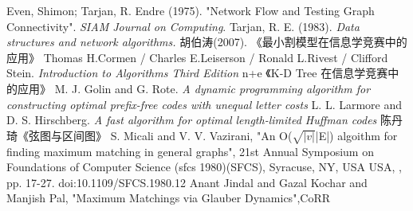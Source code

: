 \begin{thebibliography}{999}
	 Even, Shimon; Tarjan, R. Endre (1975).
	"Network Flow and Testing Graph Connectivity".
    \emph{SIAM Journal on Computing}.
     Tarjan, R. E. (1983).
    \emph{Data structures and network algorithms.}
    胡伯涛(2007). 《最小割模型在信息学竞赛中的应用》
      Thomas H.Cormen / Charles E.Leiserson /
     Ronald L.Rivest / Clifford Stein.
     \emph{Introduction to Algorithms Third Edition}
    n+e 《K-D Tree 在信息学竞赛中的应用》
    M. J. Golin and G. Rote.
    \emph{A dynamic programming algorithm for constructing optimal
    prefix-free codes with unequal letter costs}
    L. L. Larmore and D. S. Hirschberg.
    \emph{A fast algorithm for optimal length-limited Huffman codes}
     陈丹琦《弦图与区间图》
    S. Micali and V. V. Vazirani,
    "An O($\sqrt{|v|}$|E|) algoithm for finding maximum matching
    in general graphs",
     21st Annual Symposium on Foundations of Computer Science (sfcs 1980)(SFCS),
     Syracuse, NY, USA USA, , pp. 17-27.
    doi:10.1109/SFCS.1980.12
     Anant Jindal and Gazal Kochar and Manjish Pal,
    "Maximum Matchings via Glauber Dynamics",CoRR
\end{thebibliography}
